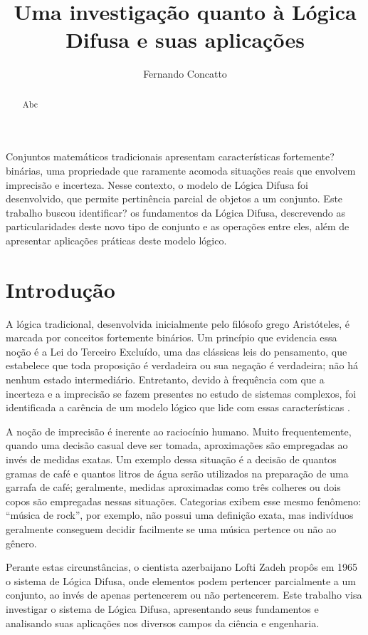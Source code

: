 \documentclass[12pt]{article}
\title{Uma investigação quanto à Lógica Difusa e suas aplicações}
\author{Fernando Concatto\inst{1}}
\begin{document}
\maketitle

\begin{abstract}
  Abc
\end{abstract}

\begin{resumo}
  Conjuntos matemáticos tradicionais apresentam características fortemente? binárias, uma propriedade que raramente acomoda situações reais que envolvem imprecisão e incerteza. Nesse contexto, o modelo de Lógica Difusa foi desenvolvido, que permite pertinência parcial de objetos a um conjunto. Este trabalho buscou identificar? os fundamentos da Lógica Difusa, descrevendo as particularidades deste novo tipo de conjunto e as operações entre eles, além de apresentar aplicações práticas deste modelo lógico.
\end{resumo}

\section{Introdução} \label{sec:intro}

A lógica tradicional, desenvolvida inicialmente pelo filósofo grego Aristóteles, é marcada por conceitos fortemente binários. Um princípio que evidencia essa noção é a Lei do Terceiro Excluído, uma das clássicas leis do pensamento, que estabelece que toda proposição é verdadeira ou sua negação é verdadeira; não há nenhum estado intermediário. Entretanto, devido à frequência com que a incerteza e a imprecisão se fazem presentes no estudo de sistemas complexos, foi identificada a carência de um modelo lógico que lide com essas características \cite{Ross2010}.

A noção de imprecisão é inerente ao raciocínio humano. Muito frequentemente, quando uma decisão casual deve ser tomada, aproximações são empregadas ao invés de medidas exatas. Um exemplo dessa situação é a decisão de quantos gramas de café e quantos litros de água serão utilizados na preparação de uma garrafa de café; geralmente, medidas aproximadas como três colheres ou dois copos são empregadas nessas situações. Categorias exibem esse mesmo fenômeno: ``música de rock'', por exemplo, não possui uma definição exata, mas indivíduos geralmente conseguem decidir facilmente se uma música pertence ou não ao gênero.

Perante estas circunstâncias, o cientista azerbaijano Lofti Zadeh propôs em 1965 o sistema de Lógica Difusa, onde elementos podem pertencer parcialmente a um conjunto, ao invés de apenas pertencerem ou não pertencerem. Este trabalho visa investigar o sistema de Lógica Difusa, apresentando seus fundamentos e analisando suas aplicações nos diversos campos da ciência e engenharia.
\end{document}
